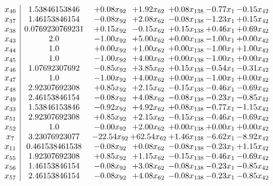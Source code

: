 \documentclass[8pt]{article}
\begin{document}
\[\begin{array}{c| c c@{\hskip 2pt} c@{\hskip 2pt} c@{\hskip 2pt} c@{\hskip 2pt} c@{\hskip 2pt} }
 x_{40}   &  1.53846153846 & +  0.08 x_{92} & +  1.92 x_{62} & +  0.08 x_{138} & -0.77 x_{1} & -0.15 x_{42}\\
 x_{37}   &  1.46153846154 & -0.08 x_{92} & +  2.08 x_{62} & -0.08 x_{138} & -1.23 x_{1} & +  0.15 x_{42}\\
 x_{38}   &  0.0769230769231 & +  0.15 x_{92} & -0.15 x_{62} & +  0.15 x_{138} & +  0.46 x_{1} & +  0.69 x_{42}\\
 x_{43}   &  2.0 & -1.00 x_{92} & +  5.00 x_{62} & +  0.00 x_{138} & -1.00 x_{1} & +  0.00 x_{42}\\
 x_{44}   &  1.0 & +  0.00 x_{92} & +  1.00 x_{62} & +  0.00 x_{138} & -1.00 x_{1} & +  1.00 x_{42}\\
 x_{45}   &  1.0 & -1.00 x_{92} & +  4.00 x_{62} & +  0.00 x_{138} & -1.00 x_{1} & +  0.00 x_{42}\\
 x_{46}   &  1.07692307692 & -0.85 x_{92} & +  3.85 x_{62} & +  0.15 x_{138} & -0.54 x_{1} & -0.31 x_{42}\\
 x_{47}   &  1.0 & -1.00 x_{92} & +  4.00 x_{62} & +  0.00 x_{138} & -1.00 x_{1} & +  0.00 x_{42}\\
 x_{48}   &  2.92307692308 & +  0.85 x_{92} & +  2.15 x_{62} & -0.15 x_{138} & -0.46 x_{1} & -0.69 x_{42}\\
 x_{49}   &  2.46153846154 & -0.08 x_{92} & +  4.08 x_{62} & -0.08 x_{138} & -0.23 x_{1} & -0.85 x_{42}\\
 x_{33}   &  1.53846153846 & -0.92 x_{92} & +  4.92 x_{62} & +  0.08 x_{138} & -0.77 x_{1} & -1.15 x_{42}\\
 x_{51}   &  2.92307692308 & +  0.85 x_{92} & +  2.15 x_{62} & -0.15 x_{138} & -0.46 x_{1} & -0.69 x_{42}\\
 x_{52}   &  1.0 & -0.00 x_{92} & +  2.00 x_{62} & +  0.00 x_{138} & +  0.00 x_{1} & +  0.00 x_{42}\\
 x_{7}   &  3.23076923077 & -22.54 x_{92} & + 62.54 x_{62} & +  1.46 x_{138} & -6.62 x_{1} & -8.92 x_{42}\\
 x_{11}   &  0.461538461538 & -0.08 x_{92} & +  0.08 x_{62} & -0.08 x_{138} & -0.23 x_{1} & +  1.15 x_{42}\\
 x_{55}   &  1.92307692308 & +  0.85 x_{92} & +  1.15 x_{62} & -0.15 x_{138} & -0.46 x_{1} & -0.69 x_{42}\\
 x_{56}   &  1.46153846154 & -0.08 x_{92} & +  3.08 x_{62} & -0.08 x_{138} & -0.23 x_{1} & -0.85 x_{42}\\
 x_{57}   &  2.46153846154 & -0.08 x_{92} & +  4.08 x_{62} & -0.08 x_{138} & -0.23 x_{1} & -0.85 x_{42}\\

\end{array}\]
\end{document}
